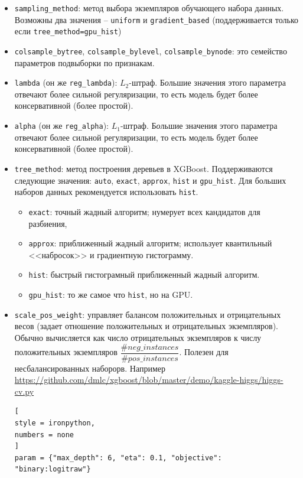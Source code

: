 \documentclass[%
	11pt,
	a4paper,
	utf8,
		]{article}
\begin{document}
\begin{itemize}
	\item \verb|sampling_method|: метод выбора экземпляров обучающего набора данных. Возможны два значения -- \verb|uniform| и \verb|gradient_based| (поддерживается только если \verb|tree_method=gpu_hist|)
	
	\item \verb|colsample_bytree|, \verb|colsample_bylevel|, \verb|colsample_bynode|: это семейство параметров подвыборки по признакам.
	
	\item \verb|lambda| (он же \verb|reg_lambda|): $ L_2 $-штраф. Б\emph{о}льшие значения этого параметра отвечают более сильной регуляризации, то есть модель будет более консервативной (более простой).
	
	\item \verb|alpha| (он же \verb|reg_alpha|): $ L_1 $-штраф. Б\emph{о}льшие значения этого параметра отвечают более сильной регуляризации, то есть модель будет более консервативной (более простой).
	
	\item \verb|tree_method|: метод построения деревьев в XGBoost. Поддерживаются следующие значения: \verb|auto|, \verb|exact|, \verb|approx|, \verb|hist| и \verb|gpu_hist|. Для больших наборов данных рекомендуется использовать \verb|hist|.
\begin{itemize}
	\item \verb|exact|: точный жадный алгоритм; нумерует всех кандидатов для разбиения,
	
	\item \verb|approx|: приближенный жадный алгоритм; использует квантильный <<набросок>> и градиентную гистограмму.
	
	\item \verb|hist|: быстрый гистограмный приближенный жадный алгоритм.
	
	\item \verb|gpu_hist|: то же самое что \verb|hist|, но на GPU.
\end{itemize}

    \item \verb|scale_pos_weight|: управляет балансом положительных и отрицательных весов (задает отношение положительных и отрицательных экземпляров). Обычно вычисляется как число отрицательных экземпляров к числу положительных экземпляров $ \dfrac{\#neg\_instances}{\#pos\_instances} $. Полезен для несбалансированных наборорв. Например \url{https://github.com/dmlc/xgboost/blob/master/demo/kaggle-higgs/higgs-cv.py}
\begin{lstlisting}[
style = ironpython,
numbers = none
]
param = {"max_depth": 6, "eta": 0.1, "objective": "binary:logitraw"}


\end{lstlisting}
\end{itemize}
\end{document}
